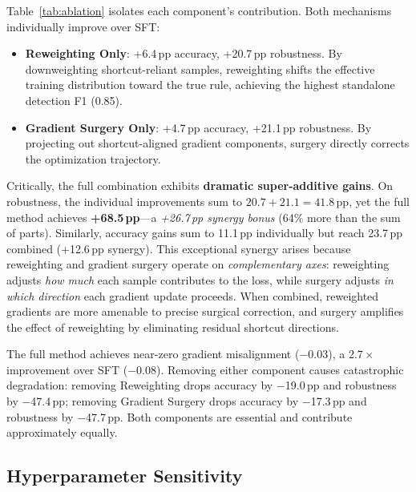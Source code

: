 Table~\ref{tab:ablation} isolates each component's contribution. Both mechanisms individually improve over SFT:

\begin{itemize}[leftmargin=*, itemsep=2pt]
\item \textbf{Reweighting Only}: +6.4\,pp accuracy, +20.7\,pp robustness. By downweighting shortcut-reliant samples, reweighting shifts the effective training distribution toward the true rule, achieving the highest standalone detection F1 (0.85).
\item \textbf{Gradient Surgery Only}: +4.7\,pp accuracy, +21.1\,pp robustness. By projecting out shortcut-aligned gradient components, surgery directly corrects the optimization trajectory.
\end{itemize}

Critically, the full combination exhibits \textbf{dramatic super-additive gains}. On robustness, the individual improvements sum to $20.7 + 21.1 = 41.8$\,pp, yet the full method achieves \textbf{+68.5\,pp}---a \emph{+26.7\,pp synergy bonus} (64\% more than the sum of parts). Similarly, accuracy gains sum to 11.1\,pp individually but reach 23.7\,pp combined (+12.6\,pp synergy). This exceptional synergy arises because reweighting and gradient surgery operate on \emph{complementary axes}: reweighting adjusts \emph{how much} each sample contributes to the loss, while surgery adjusts \emph{in which direction} each gradient update proceeds. When combined, reweighted gradients are more amenable to precise surgical correction, and surgery amplifies the effect of reweighting by eliminating residual shortcut directions.

The full method achieves near-zero gradient misalignment ($-0.03$), a $2.7{\times}$ improvement over SFT ($-0.08$). Removing either component causes catastrophic degradation: removing Reweighting drops accuracy by $-$19.0\,pp and robustness by $-$47.4\,pp; removing Gradient Surgery drops accuracy by $-$17.3\,pp and robustness by $-$47.7\,pp. Both components are essential and contribute approximately equally.

\subsection{Hyperparameter Sensitivity}
\label{sec:exp_sensitivity}

